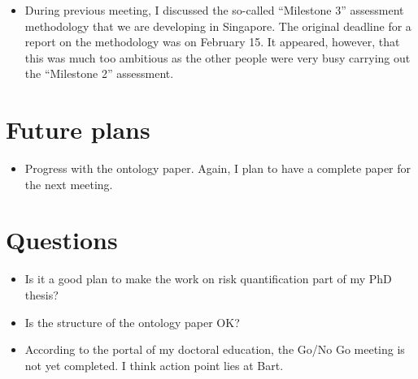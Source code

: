 \documentclass[10pt,final,a4paper,oneside,onecolumn]{article}
\begin{document}
\begin{itemize}
	\item During previous meeting, I discussed the so-called ``Milestone 3'' assessment methodology that we are developing in Singapore. The original deadline for a report on the methodology was on February 15. It appeared, however, that this was much too ambitious as the other people were very busy carrying out the ``Milestone 2'' assessment. 
\end{itemize}

\section{Future plans}

\begin{itemize}
	\item Progress with the ontology paper. Again, I plan to have a complete paper for the next meeting.
\end{itemize}

\section{Questions}

\begin{itemize}
	\item Is it a good plan to make the work on risk quantification part of my PhD thesis?
	\item Is the structure of the ontology paper OK?
	\item According to the portal of my doctoral education, the Go/No Go meeting is not yet completed. I think action point lies at Bart.
\end{itemize}


\printbibliography


\newpage


\end{document}

